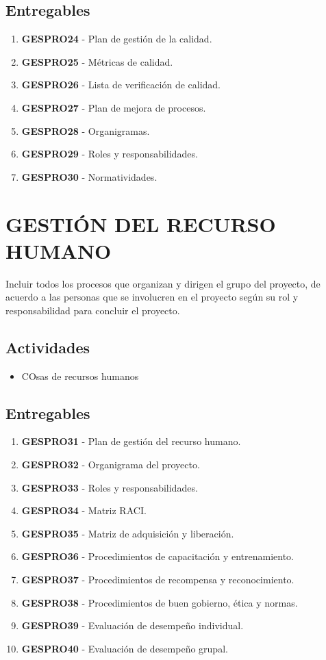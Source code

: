 \section{Entregables}

\begin{enumerate}
	\item \textbf{GESPRO24} - Plan de gesti\'on de la calidad.
	\item \textbf{GESPRO25} - M\'etricas de calidad.
	\item \textbf{GESPRO26} - Lista de verificaci\'on de calidad.
	\item \textbf{GESPRO27} - Plan de mejora de procesos.
	\item \textbf{GESPRO28} - Organigramas.
	\item \textbf{GESPRO29} - Roles y responsabilidades.
	\item \textbf{GESPRO30} - Normatividades.
\end{enumerate}

\chapter{GESTI\'ON DEL RECURSO HUMANO}
Incluir todos los procesos que organizan y dirigen el grupo del proyecto, de acuerdo a las
personas que se involucren en el proyecto seg\'un su rol y responsabilidad para concluir el proyecto.

\section{Actividades}
\begin{itemize}
	\item COsas de recursos humanos
\end{itemize}

\section{Entregables}

\begin{enumerate}
	\item \textbf{GESPRO31} - Plan de gesti\'on del recurso humano.
	\item \textbf{GESPRO32} - Organigrama del proyecto.
	\item \textbf{GESPRO33} - Roles y responsabilidades.
	\item \textbf{GESPRO34} - Matriz RACI.
	\item \textbf{GESPRO35} - Matriz de adquisici\'on y liberaci\'on.
	\item \textbf{GESPRO36} - Procedimientos de capacitaci\'on y entrenamiento.
	\item \textbf{GESPRO37} - Procedimientos de recompensa y reconocimiento.
	\item \textbf{GESPRO38} - Procedimientos de buen gobierno, \'etica y normas.
	\item \textbf{GESPRO39} - Evaluaci\'on de desempe\~no individual.
	\item \textbf{GESPRO40} - Evaluaci\'on de desempe\~no grupal.
\end{enumerate}

